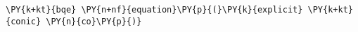 \begin{Verbatim}[commandchars=\\\{\}]
    \PY{k+kt}{bqe} \PY{n+nf}{equation}\PY{p}{(}\PY{k}{explicit} \PY{k+kt}{conic} \PY{n}{co}\PY{p}{)}
\end{Verbatim}
